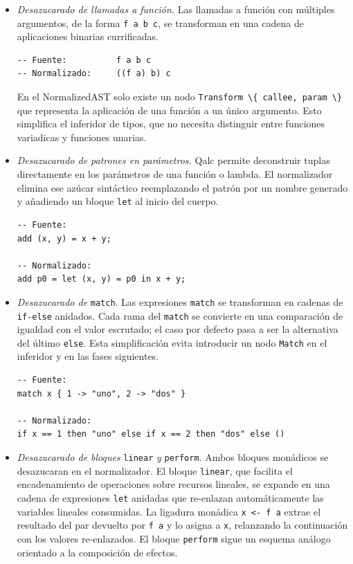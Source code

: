 \begin{itemize}
  \item \textit{Desazucarado de llamadas a función.} Las llamadas a función con múltiples argumentos, de la forma \lstinline|f a b c|, se transforman en una cadena de aplicaciones binarias currificadas.

\begin{lstlisting}[language={}, caption=Desazucarado de llamadas a función con múltiples argumentos]
-- Fuente:          f a b c
-- Normalizado:     ((f a) b) c
\end{lstlisting}

  En el NormalizedAST solo existe un nodo \lstinline|Transform \{ callee, param \}| que representa la aplicación de una función a un único argumento. Esto simplifica el inferidor de tipos, que no necesita distinguir entre funciones variadicas y funciones unarias.

  \item \textit{Desazucarado de patrones en parámetros.} Qalc permite deconstruir tuplas directamente en los parámetros de una función o lambda. El normalizador elimina ese azúcar sintáctico reemplazando el patrón por un nombre generado y añadiendo un bloque \lstinline|let| al inicio del cuerpo.

\begin{lstlisting}[language={}, caption=Desazucarado de deconstrucción de tupla en parámetros]
-- Fuente:
add (x, y) = x + y;

-- Normalizado:
add p0 = let (x, y) = p0 in x + y;
\end{lstlisting}

  \item \textit{Desazucarado de} \texttt{match}. Las expresiones \lstinline|match| se transforman en cadenas de \lstinline|if-else| anidados. Cada rama del \lstinline|match| se convierte en una comparación de igualdad con el valor escrutado; el caso por defecto pasa a ser la alternativa del último \lstinline|else|. Esta simplificación evita introducir un nodo \lstinline|Match| en el inferidor y en las fases siguientes.

\begin{lstlisting}[language={}, caption=Desazucarado de match a cadena de if-else]
-- Fuente:
match x { 1 -> "uno", 2 -> "dos" }

-- Normalizado:
if x == 1 then "uno" else if x == 2 then "dos" else ()
\end{lstlisting}

  \item \textit{Desazucarado de bloques} \texttt{linear} \textit{y} \texttt{perform}. Ambos bloques monádicos se desazucaran en el normalizador. El bloque \lstinline|linear|, que facilita el encadenamiento de operaciones sobre recursos lineales, se expande en una cadena de expresiones \lstinline|let| anidadas que re-enlazan automáticamente las variables lineales consumidas. La ligadura monádica \lstinline|x <- f a| extrae el resultado del par devuelto por \lstinline|f a| y lo asigna a \lstinline|x|, relanzando la continuación con los valores re-enlazados. El bloque \lstinline|perform| sigue un esquema análogo orientado a la composición de efectos.
\end{itemize}

